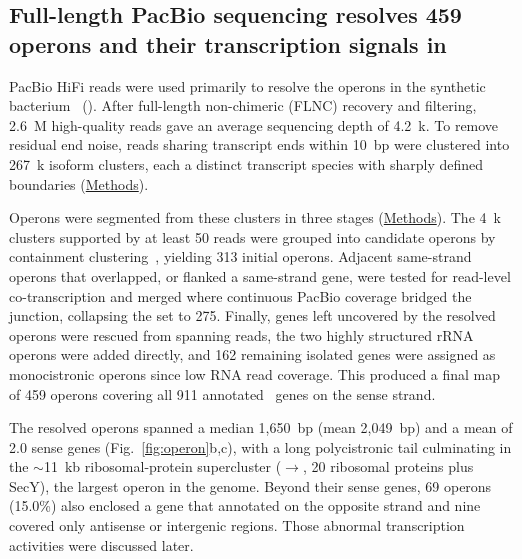 \subsection{Full-length PacBio sequencing resolves 459 operons and their transcription signals in \syn}

PacBio HiFi reads were used primarily to resolve the operons in the synthetic bacterium \jsyn~(\syn).
After full-length non-chimeric (FLNC) recovery and filtering, 2.6~M high-quality reads gave an average sequencing depth of 4.2~k.
To remove residual end noise, reads sharing transcript ends within 10~bp were clustered into 267~k isoform clusters, each a distinct transcript species with sharply defined boundaries (\hyperref[method:pacbio-clustering]{Methods}).

Operons were segmented from these clusters in three stages (\hyperref[method:pacbio-operon]{Methods}).
The 4~k clusters supported by at least 50 reads were grouped into candidate operons by containment clustering~\cite{yan_smrt-cappable-seq_2018}, yielding 313 initial operons.
Adjacent same-strand operons that overlapped, or flanked a same-strand gene, were tested for read-level co-transcription and merged where continuous PacBio coverage bridged the junction, collapsing the set to 275.
Finally, genes left uncovered by the resolved operons were rescued from spanning reads, the two highly structured rRNA operons were added directly, and 162 remaining isolated genes were assigned as monocistronic operons since low RNA read coverage.
This produced a final map of 459 operons covering all 911 annotated \syn~genes on the sense strand.

The resolved operons spanned a median 1{,}650~bp (mean 2{,}049~bp) and a mean of 2.0 sense genes (Fig.~\ref{fig:operon}b,c), with a long polycistronic tail culminating in the $\sim$11~kb ribosomal-protein supercluster ($\rightarrow$, 20 ribosomal proteins plus SecY), the largest operon in the genome.
Beyond their sense genes, 69 operons (15.0\%) also enclosed a gene that annotated on the opposite strand and nine covered only antisense or intergenic regions. Those abnormal transcription activities were discussed later.


